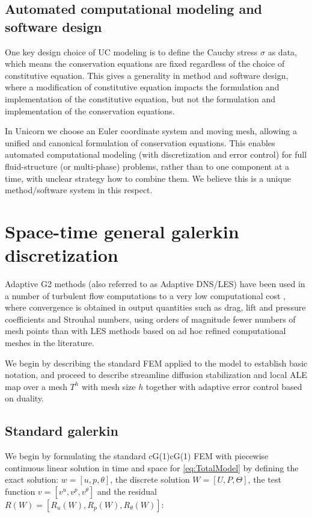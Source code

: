 \subsection{Automated computational modeling and software design}

One key design choice of UC modeling is to define the Cauchy stress
$\sigma$ as data, which means the conservation equations are fixed
regardless of the choice of constitutive equation. This gives a
generality in method and software design, where a modification of
constitutive equation impacts the formulation and implementation of the
constitutive equation, but not the formulation and implementation of the
conservation equations.

In Unicorn we choose an Euler coordinate system and moving mesh,
allowing a unified and canonical formulation of conservation
equations. This enables automated computational modeling (with
discretization and error control) for full fluid-structure (or
multi-phase) problems, rather than to one component at a time, with
unclear strategy how to combine them. We believe this is a unique
method/software system in this respect.

\section{Space-time general galerkin discretization}

Adaptive G2 methods (also referred to as Adaptive DNS/LES) have been used in a number of turbulent flow computations to a very low computational cost \cite{Hoffman2005,HoffmanJohnson2006b,Hoffman2006,Hoffman2009,HoffmanJansson2009,VilelaJanssonEtAl2010}, where convergence is obtained in output quantities such as drag, lift and pressure coefficients and Strouhal numbers, using orders of magnitude fewer numbers of mesh points than with LES methods based on ad hoc refined computational meshes in the literature. 

We begin by describing the standard FEM applied to the model to
establish basic notation, and proceed to describe streamline diffusion
stabilization and local ALE map over a mesh $T^h$ with mesh size $h$
together with adaptive error control based on duality.

\subsection{Standard galerkin}

We begin by formulating the standard cG(1)cG(1) FEM
\cite{ErikssonEstepHansboEtAl1996} with piecewise continuous linear solution in time
and space for \ref{eq:TotalModel} by defining the exact solution: $w =
[u, p, \theta]$, the discrete solution $W = [U, P, \Theta]$, the
test function $v = [v^u, v^p, v^\theta]$ and the residual $R(W) =
[R_u(W), R_p(W), R_\theta(W)]$:

